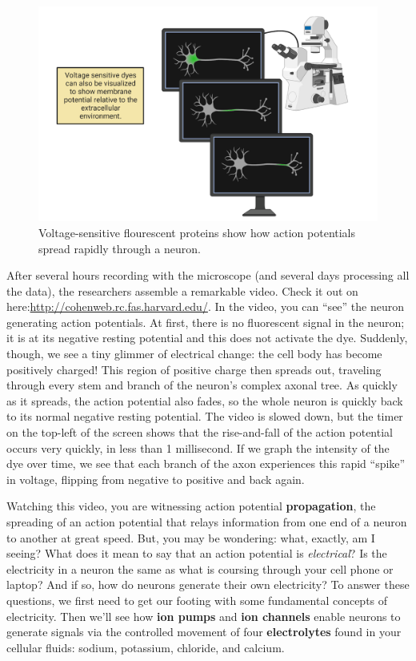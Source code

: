 \documentclass[
]{book}
\begin{document}
\begin{figure}

{\centering \includegraphics[width=0.9\linewidth]{images/ch02/02_10} 

}

\caption{Voltage-sensitive flourescent proteins show how action potentials spread rapidly through a neuron.}\label{fig:ch02-vsfp}
\end{figure}

After several hours recording with the microscope (and several days processing all the data), the researchers assemble a remarkable video. Check it out on here:\url{http://cohenweb.rc.fas.harvard.edu/}. In the video, you can ``see'' the neuron generating action potentials. At first, there is no fluorescent signal in the neuron; it is at its negative resting potential and this does not activate the dye. Suddenly, though, we see a tiny glimmer of electrical change: the cell body has become positively charged! This region of positive charge then spreads out, traveling through every stem and branch of the neuron's complex axonal tree. As quickly as it spreads, the action potential also fades, so the whole neuron is quickly back to its normal negative resting potential. The video is slowed down, but the timer on the top-left of the screen shows that the rise-and-fall of the action potential occurs very quickly, in less than 1 millisecond. If we graph the intensity of the dye over time, we see that each branch of the axon experiences this rapid ``spike'' in voltage, flipping from negative to positive and back again.

Watching this video, you are witnessing action potential \textbf{propagation}, the spreading of an action potential that relays information from one end of a neuron to another at great speed. But, you may be wondering: what, exactly, am I seeing? What does it mean to say that an action potential is \emph{electrical}? Is the electricity in a neuron the same as what is coursing through your cell phone or laptop? And if so, how do neurons generate their own electricity? To answer these questions, we first need to get our footing with some fundamental concepts of electricity. Then we'll see how \textbf{ion pumps} and \textbf{ion channels} enable neurons to generate signals via the controlled movement of four \textbf{electrolytes} found in your cellular fluids: sodium, potassium, chloride, and calcium.
\end{document}
